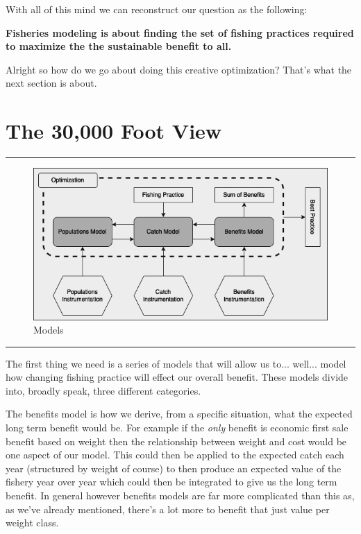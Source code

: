 \documentclass[11pt,a5paper]{book}
\begin{document}
With all of this mind we can reconstruct our question as the following:
\newline

 \hangindent=1cm \noindent \textbf{Fisheries modeling is about finding the set of fishing practices required to maximize the the sustainable benefit to all.}
\newline

Alright so how do we go about doing this creative optimization? That's what the next section is about. 
\newpage

\section{The 30,000 Foot View}

\noindent \rule{\textwidth}{0.5pt} 
\begin{figure}[h!] 
  \includegraphics[width=\linewidth]{drawings/high_level_models.png}
  \caption{Models}
  \label{fig:high_level_models}
\end{figure}
\newline
\rule{\textwidth}{0.5pt} 
\vspace{5pt}

The first thing we need is a series of models that will allow us to... well... model how changing fishing practice will effect our overall benefit. These models divide into, broadly speak, three different categories. 
\newline

The benefits model is how we derive, from a specific situation, what the expected long term benefit would be. For example if the \textit{only} benefit is economic first sale benefit based on weight then the relationship between weight and cost would be one aspect of our model. This could then be applied to the expected catch each year (structured by weight of course) to then produce an expected value of the fishery year over year which could then be integrated to give us the long term benefit. In general however benefits models are far more complicated than this as, as we've already mentioned, there's a lot more to benefit that just value per weight class.
\newline
\end{document}
